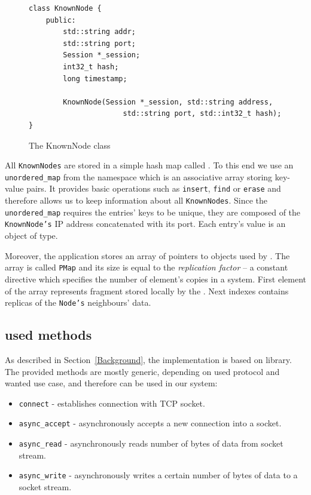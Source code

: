 \begin{figure}[ht] 
\renewcommand{\figurename}{Listing}
    \begin{lstlisting}
class KnownNode {
    public:
        std::string addr;
        std::string port;
        Session *_session;
        int32_t hash;
        long timestamp;

        KnownNode(Session *_session, std::string address,
                      std::string port, std::int32_t hash);
}
    \end{lstlisting}
    
\caption{The KnownNode class}
\label{Node}
\end{figure}

        All \texttt{KnownNodes} are stored in a simple hash map called \NodesMap.
        To this end we use an \texttt{unordered\_map} \cite{Unordered} from the \std namespace which is an associative array storing key-value pairs.
        It provides basic operations such as \texttt{insert}, \texttt{find} or \texttt{erase} and therefore allows us to keep information about all \texttt{KnownNodes}.
        Since the \texttt{unordered\_map} requires the entries' keys to be unique, they are composed of the \texttt{KnownNode's} IP address concatenated with its port. 
        Each entry's value is an object of \KnownNode type.
        
        Moreover, the application stores an array of pointers to \PHT objects used by \Node.
        The array is called \texttt{PMap} and its size is equal to the \textit{replication factor} -- a constant directive which specifies the number of element's copies in a system.
        First element of the array represents \PHT fragment stored locally by the \Node.
        Next indexes contains replicas of the \texttt{Node's}\xspace neighbours' data.

    \subsection{\Asio used methods}
        As described in Section~\ref{Background}, the \DHTS implementation is based on \Asio library.
        The provided methods are mostly generic, depending on used protocol and wanted use case, and therefore can be used in our system:
        \begin{itemize}
            \item \texttt{connect} - establishes connection with TCP socket.
            \item \texttt{async\_accept} - asynchronously accepts a new connection into a socket.
            \item \texttt{async\_read} - asynchronously reads number of bytes of data from socket stream.
            \item \texttt{async\_write} - asynchronously writes a certain number of bytes of data to a socket stream.
        \end{itemize}
        
